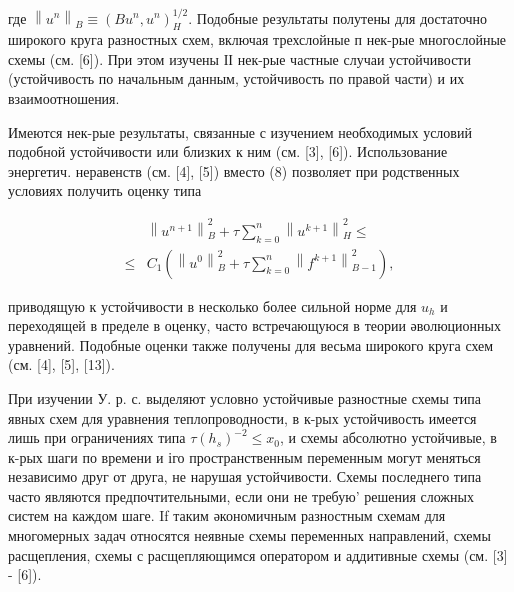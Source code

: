 \documentclass[10pt]{article}
\begin{document}
где $\left\|u^{n}\right\|_{B} \equiv\left(B u^{n}, u^{n}\right)_{H}^{1 / 2}$. Подобные результаты полутены для достаточно широкого круга разностных схем, включая трехслойные п нек-рые многослойные схемы (см. [6]). При этом изучены ІІ нек-рые частные случаи устойчивости (устойчивость по начальным данным, устойчивость по правой части) и их взаимоотношения.



Имеются нек-рые результаты, связанные с изучением необходимых условий подобной устойчивости или близких к ним (см. [3], [6]). Использование энергетич. неравенств (см. [4], [5]) вместо (8) позволяет при родственных условиях получить оценку типа



\[

\begin{aligned}

& \left\|u^{n+1}\right\|_{B}^{2}+\tau \sum_{k=0}^{n}\left\|u^{k+1}\right\|_{H}^{2} \leqslant \\

\leqslant & C_{1}\left(\left\|u^{0}\right\|_{B}^{2}+\tau \sum_{k=0}^{n}\left\|f^{k+1}\right\|_{B-1}^{2}\right),

\end{aligned}

\]



приводящую к устойчивости в несколько более сильной норме для $u_{h}$ и переходящей в пределе в оценку, часто встречающуюся в теории әволюционных уравнений. Подобные оценки также получены для весьма широкого круга схем (см. [4], [5], [13]).



При изучении У. р. с. выделяют условно устойчивые разностные схемы типа явных схем для уравнения теплопроводности, в к-рых устойчивость имеется лишь при ограничениях типа $\tau\left(h_{s}\right)^{-2} \leqslant x_{0}$, и схемы абсолютно устойчивые, в к-рых шаги по времени и іго пространственным переменным могут меняться независимо друг от друга, не нарушая устойчивости. Схемы последнего типа часто являются предпочтительными, если они не требую' решения сложных систем на каждом шаге. If таким әкономичным разностным схемам для многомерных задач относятся неявные схемы переменных направлений, схемы расщепления, схемы с расщепляющимся оператором и аддитивные схемы (см. [3] - [6]).
\end{document}
